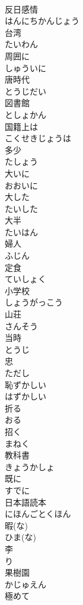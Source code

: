 \documentclass[8pt]{extreport}
\begin{document}
\begin{CJK}{UTF8}{min}
\\	反日感情	
\\	はんにちかんじょう
\\	台湾	
\\	たいわん
\\	周囲に	
\\	しゅういに
\\	唐時代	
\\	とうじだい
\\	図書館	
\\	としょかん
\\	国籍上は	
\\	こくせきじょうは
\\	多少	
\\	たしょう
\\	大いに	
\\	おおいに
\\	大した	
\\	たいした
\\	大半	
\\	たいはん
\\	婦人	
\\	ふじん
\\	定食	
\\	ていしょく
\\	小学校	
\\	しょうがっこう
\\	山荘	
\\	さんそう
\\	当時	
\\	とうじ
\\	忠	
\\	ただし
\\	恥ずかしい	
\\	はずかしい
\\	折る	
\\	おる
\\	招く	
\\	まねく
\\	教科書	
\\	きょうかしょ
\\	既に	
\\	すでに
\\	日本語読本	
\\	にほんごとくほん
\\	暇(な)	
\\	ひま(な)
\\	李	
\\	り
\\	果樹園	
\\	かじゅえん
\\	極めて	

\end{CJK}
\end{document}

